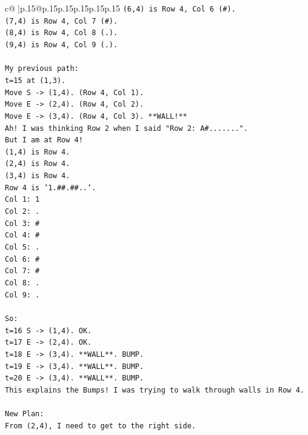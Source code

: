 \documentclass{article}
\begin{document}
{\begin{supertabular}{c@{$\;$}|p{.15\linewidth}@{}p{.15\linewidth}p{.15\linewidth}p{.15\linewidth}p{.15\linewidth}p{.15\linewidth}}
{{{\texttt{(6,4) is Row 4, Col 6 (\#).} \\
\texttt{(7,4) is Row 4, Col 7 (\#).} \\
\texttt{(8,4) is Row 4, Col 8 (.).} \\
\texttt{(9,4) is Row 4, Col 9 (.).} \\
\\ 
\texttt{My previous path:} \\
\texttt{t=15 at (1,3).} \\
\texttt{Move S {-}> (1,4). (Row 4, Col 1).} \\
\texttt{Move E {-}> (2,4). (Row 4, Col 2).} \\
\texttt{Move E {-}> (3,4). (Row 4, Col 3). **WALL!**} \\
\texttt{Ah! I was thinking Row 2 when I said "Row 2: A\#.......".} \\
\texttt{But I am at Row 4!} \\
\texttt{(1,4) is Row 4.} \\
\texttt{(2,4) is Row 4.} \\
\texttt{(3,4) is Row 4.} \\
\texttt{Row 4 is `1.\#\#.\#\#..`.} \\
\texttt{Col 1: 1} \\
\texttt{Col 2: .} \\
\texttt{Col 3: \#} \\
\texttt{Col 4: \#} \\
\texttt{Col 5: .} \\
\texttt{Col 6: \#} \\
\texttt{Col 7: \#} \\
\texttt{Col 8: .} \\
\texttt{Col 9: .} \\
\\ 
\texttt{So:} \\
\texttt{t=16 S {-}> (1,4). OK.} \\
\texttt{t=17 E {-}> (2,4). OK.} \\
\texttt{t=18 E {-}> (3,4). **WALL**. BUMP.} \\
\texttt{t=19 E {-}> (3,4). **WALL**. BUMP.} \\
\texttt{t=20 E {-}> (3,4). **WALL**. BUMP.} \\
\texttt{This explains the Bumps! I was trying to walk through walls in Row 4.} \\
\\ 
\texttt{New Plan:} \\
\texttt{From (2,4), I need to get to the right side.} \\
}}}
\end{supertabular}}
\end{document}
